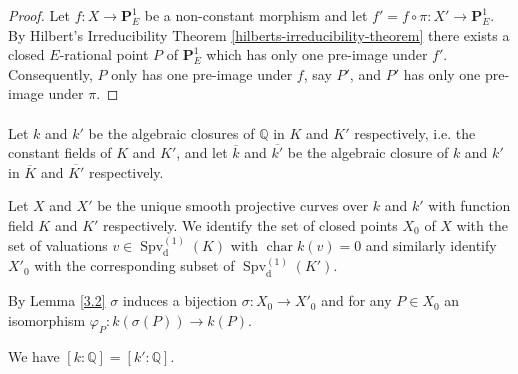 \begin{proof}
Let $f: X\to\mathbf{P}^1_E$ be a non-constant morphism and let $f' =  f\circ \pi: X'\to\mathbf{P}^1_E$. By Hilbert's Irreducibility Theorem \ref{hilberts-irreducibility-theorem} there exists a closed $E$-rational point $P$ of $\mathbf{P}^1_E$ which has only one pre-image under $f'$. Consequently, $P$ only has one pre-image under $f$, say $P'$, and $P'$ has only one pre-image under $\pi$.
\end{proof}

\paragraph{} Let $k$ and $k'$ be the algebraic closures of $\mathbb{Q}$ in $K$ and $K'$ respectively, i.e. the constant fields of $K$ and $K'$, and let $\overline{k}$ and $\overline{k'}$ be the algebraic closure of $k$ and $k'$ in $\overline{K}$ and $\overline{K'}$ respectively.

Let $X$ and $X'$ be the unique smooth projective curves over $k$ and $k'$ with function field $K$ and $K'$ respectively. We identify the set of closed points $X_0$ of $X$ with the set of valuations $v\in\operatorname{Spv}_\text{d}^{(1)}(K)$ with $\operatorname{char} k(v)=0$ and similarly identify $X'_0$ with the corresponding subset of $\operatorname{Spv}_\text{d}^{(1)}(K')$. 

By Lemma \ref{3.2} $\sigma$ induces a bijection $\sigma: X_0\to X'_0$ and for any $P\in X_0$ an isomorphism $\varphi_P: k(\sigma(P))\to k(P)$.

\begin{lemma}\label{4.2-pre}
We have $[k:\mathbb{Q}] = [k':\mathbb{Q}]$.
\end{lemma}

